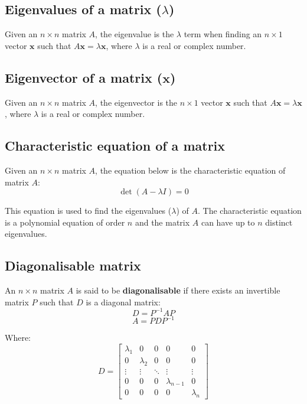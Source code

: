 \documentclass[11pt]{article}
\begin{document}
\subsection{Eigenvalues of a matrix (\(\lambda\))}
\label{sec:orgbdc0b6a}
Given an \(n \times n\) matrix \(A\), the eigenvalue is the \(\lambda\) term when finding an \(n \times 1\) vector \(\boldsymbol{x}\) such that \(A \boldsymbol{x} = \lambda \boldsymbol{x}\), where \(\lambda\) is a real or complex number.

\subsection{Eigenvector of a matrix (\(\boldsymbol{x}\))}
\label{sec:org2a6522e}
Given an \(n \times n\) matrix \(A\), the eigenvector is the \(n \times 1\) vector \(\boldsymbol{x}\) such that \(A \boldsymbol{x} = \lambda \boldsymbol{x}\), where \(\lambda\) is a real or complex number.

\subsection{Characteristic equation of a matrix}
\label{sec:org67ee866}
Given an \(n \times n\) matrix \(A\), the equation below is the characteristic equation of matrix \(A\):
\[\det (A - \lambda I) = 0\]

This equation is used to find the eigenvalues (\(\lambda\)) of \(A\). The characteristic equation is a polynomial equation of order \(n\) and the matrix \(A\) can have up to \(n\) distinct eigenvalues.

\subsection{Diagonalisable matrix}
\label{sec:org9a4a296}
An \(n \times n\) matrix \(A\) is said to be \textbf{diagonalisable} if there exists an invertible matrix \(P\) such that \(D\) is a diagonal matrix:
\[D = P^{-1} A P\]
\[A = PDP^{-1}\]

Where:
\begin{displaymath}
D = \begin{bmatrix}
\lambda_1 & 0 & 0 & 0 & 0 \\
0 & \lambda_2 & 0 & 0 & 0 \\
\vdots & \vdots & \ddots & \vdots & \vdots \\
0 & 0 & 0 & \lambda_{n-1} & 0 \\
0 & 0 & 0 & 0 & \lambda_{n}
\end{bmatrix}
\end{displaymath}
\end{document}
